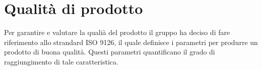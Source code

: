 \section{Qualità di prodotto}
	Per garantire e valutare la qualià del prodotto il gruppo ha deciso di fare riferimento allo strandard ISO 9126, il quale definisce i parametri per produrre un prodotto di buona qualità. Questi parametri quantificano il grado di raggiungimento di tale caratteristica.
